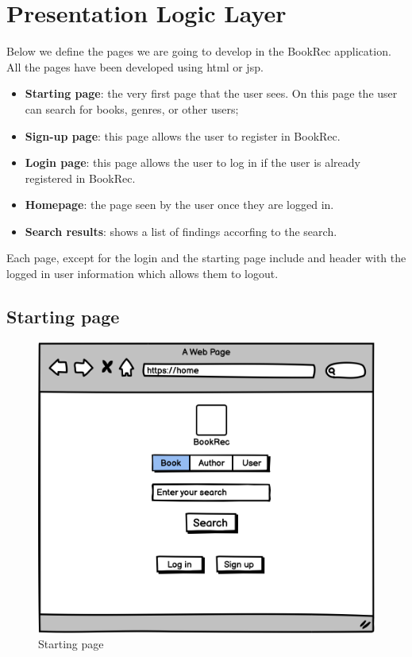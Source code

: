 \section{Presentation Logic Layer}


Below we define the pages we are going to develop in the BookRec application. All the pages have been developed using html or jsp.

\begin{itemize}
    \item \textbf{Starting page}: the very first page that the user sees. On this page the user can search for books, genres, or other users;
    \item \textbf{Sign-up page}: this page allows the user to register in BookRec.
    \item \textbf{Login page}: this page allows the user to log in if the user is already registered in BookRec.
    \item \textbf{Homepage}: the page seen by the user once they are logged in.
    \item \textbf{Search results}: shows a list of findings accorfing to the search.
\end{itemize}

Each page, except for the login and the starting page include and header with the logged in user information
which allows them to logout.

\subsection{Starting page}


\begin{figure}[h]
    \centering
    \includegraphics[width=0.5\linewidth]{sections/PLL/start.png}
    \caption{Starting page}
    \label{fig:start}
\end{figure}


